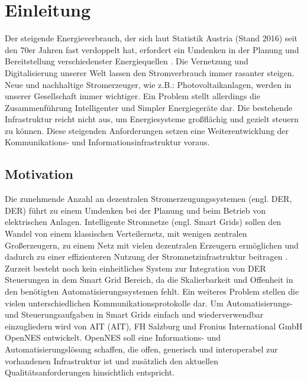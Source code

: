 \chapter{Einleitung}\label{chap:Einleitung}
\thispagestyle{standard}
\pagestyle{standard}
\renewcommand{\footrulewidth}{0.4pt}

Der steigende Energieverbrauch, der sich laut Statistik Austria (Stand 2016) seit den 70er Jahren fast verdoppelt hat, erfordert ein Umdenken in der Planung und Bereitstellung verschiedenster Energiequellen \cite{StatistikAustria}. Die Vernetzung und Digitalisierung unserer Welt lassen den Stromverbrauch immer rasanter steigen.
Neue und nachhaltige Stromerzeuger, wie z.B.: Photovoltaikanlagen, werden in unserer Gesellschaft immer wichtiger. 
Ein Problem stellt allerdings die Zusammenführung Intelligenter und Simpler Energiegeräte dar.
Die bestehende Infrastruktur reicht nicht aus, um Energiesysteme großflächig und gezielt steuern zu können.
Diese steigenden Anforderungen setzen eine Weiterentwicklung der Kommunikations- und Informationsinfrastruktur voraus. 

\section{Motivation} \label{sub:Motivation}
Die zunehmende Anzahl an dezentralen Stromerzeugungssystemen (engl. \acl{DER}, \acs{DER}) führt zu einem Umdenken bei der Planung und beim Betrieb von elektrischen Anlagen. Intelligente Stromnetze (engl. Smart Grids) sollen den Wandel von einem klassischen Verteilernetz, mit wenigen zentralen Großerzeugern, zu einem Netz mit vielen dezentralen Erzeugern ermöglichen und dadurch zu einer effizienteren Nutzung der Stromnetzinfrastruktur beitragen \cite{DERs, SmartGrids}.\\
Zurzeit besteht noch kein einheitliches System zur Integration von \acs {DER} Steuerungen in dem Smart Grid Bereich, da die Skalierbarkeit und Offenheit in den benötigten Automatisierungssystemen fehlt.
Ein weiteres Problem stellen die vielen unterschiedlichen Kommunikationsprotokolle dar.
Um Automatisierungs- und Steuerungsaufgaben in Smart Grids einfach und wiederverwendbar einzugliedern wird von \acl{AIT} (\acs{AIT}), FH Salzburg und Fronius International GmbH OpenNES entwickelt.
OpenNES soll eine Informations- und Automatisierungslösung schaffen, die offen, generisch und interoperabel zur vorhandenen Infrastruktur ist und zusätzlich den aktuellen Qualitätsanforderungen hinsichtlich entspricht.


